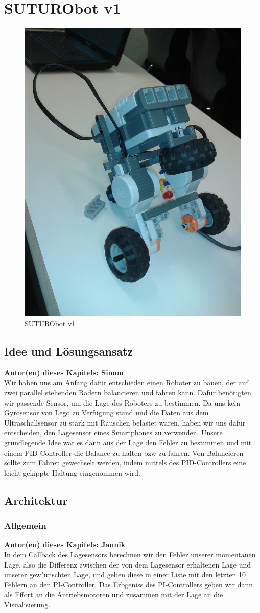 \documentclass[8pt]{article}
\newcommand{\secauthor}[1]{\textbf{Autor(en) dieses Kapitels: {#1}}\\}
\begin{document}
\section{SUTURObot v1}
\begin{figure}[h]
  \begin{center}
    \includegraphics[width=.5\textwidth]{pictures/SUTURObot-v1.jpg}  
  \end{center}
  \caption{SUTURObot v1}
  \label{fig:SUTURObot1}
\end{figure}

\subsection{Idee und Lösungsansatz} 
\secauthor{Simon}
Wir haben uns am Anfang dafür entschieden einen Roboter zu bauen, der auf zwei parallel stehenden Rädern balancieren und fahren kann. Dafür benötigten wir passende Sensor, um die Lage des Roboters zu bestimmen. Da uns kein Gyrosensor von Lego zu Verfügung stand und die Daten aus dem Ultraschallsensor zu stark mit Rauschen belastet waren, haben wir uns dafür entscheiden, den Lagesensor eines Smartphones zu verwenden. Unsere grundlegende Idee war es dann aus der Lage den Fehler zu bestimmen und mit einem PID-Controller die Balance zu halten bzw zu fahren. Von Balancieren sollte zum Fahren gewechselt werden, indem mittels des PID-Controllers eine leicht gekippte Haltung eingenommen wird.

\subsection{Architektur}

\subsubsection{Allgemein} 
\secauthor{Jannik}
In dem Callback des Lagesensors berechnen wir den Fehler unserer momentanen Lage, also die Differenz zwischen der von dem Lagesensor erhaltenen Lage und unserer gew"unschten Lage, und geben diese in einer Liste mit den letzten 10 Fehlern an den PI-Controller. Das Erbgeniss des PI-Controllers geben wir dann als Effort an die Antriebsmotoren und zusammen mit der Lage an die Visualisierung.
\end{document}
